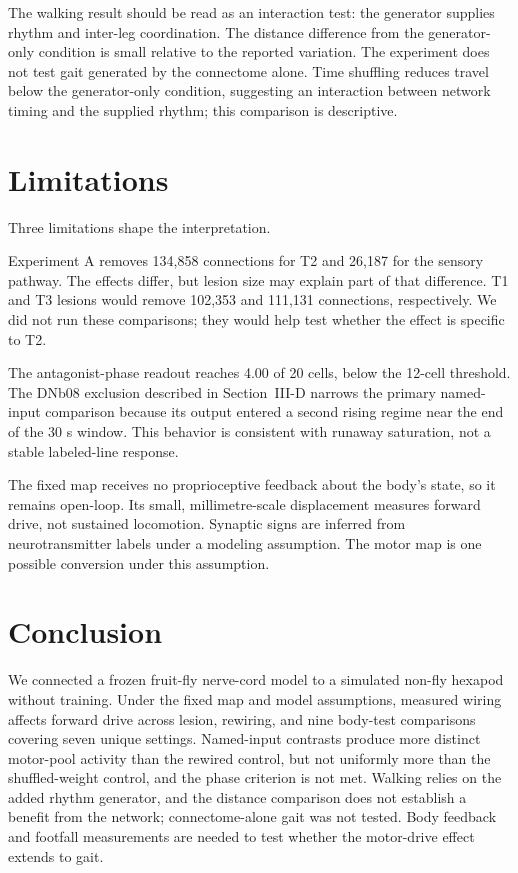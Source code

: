 \documentclass[conference]{IEEEtran}
\begin{document}
The walking result should be read as an interaction test: the generator supplies rhythm and inter-leg coordination. The distance difference from the generator-only condition is small relative to the reported variation. The experiment does not test gait generated by the connectome alone. Time shuffling reduces travel below the generator-only condition, suggesting an interaction between network timing and the supplied rhythm; this comparison is descriptive.

\section{Limitations}
Three limitations shape the interpretation.

Experiment A removes 134,858 connections for T2 and 26,187 for the sensory pathway. The effects differ, but lesion size may explain part of that difference. T1 and T3 lesions would remove 102,353 and 111,131 connections, respectively. We did not run these comparisons; they would help test whether the effect is specific to T2.

The antagonist-phase readout reaches 4.00 of 20 cells, below the 12-cell threshold. The DNb08 exclusion described in Section~III-D narrows the primary named-input comparison because its output entered a second rising regime near the end of the 30 s window. This behavior is consistent with runaway saturation, not a stable labeled-line response.

The fixed map receives no proprioceptive feedback about the body's state, so it remains open-loop. Its small, millimetre-scale displacement measures forward drive, not sustained locomotion. Synaptic signs are inferred from neurotransmitter labels under a modeling assumption. The motor map is one possible conversion under this assumption.

\section{Conclusion}
We connected a frozen fruit-fly nerve-cord model to a simulated non-fly hexapod without training. Under the fixed map and model assumptions, measured wiring affects forward drive across lesion, rewiring, and nine body-test comparisons covering seven unique settings. Named-input contrasts produce more distinct motor-pool activity than the rewired control, but not uniformly more than the shuffled-weight control, and the phase criterion is not met. Walking relies on the added rhythm generator, and the distance comparison does not establish a benefit from the network; connectome-alone gait was not tested. Body feedback and footfall measurements are needed to test whether the motor-drive effect extends to gait.

\renewcommand{\IEEEbibitemsep}{0pt plus 0pt}


\end{document}
